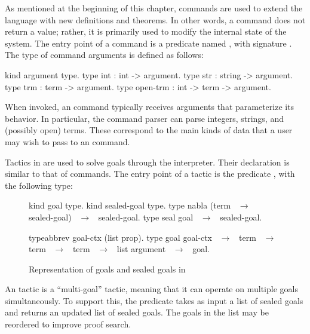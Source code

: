 As mentioned at the beginning of this chapter, commands are used to extend the
\rocq language with new definitions and theorems. In other words, a command
does not return a value; rather, it is primarily used to modify the internal
state of the system. The entry point of a command is a predicate named
, with signature .
The type of command arguments is defined as follows:

\begin{elpicode}
kind argument type.
type int      : int    -> argument.
type str      : string -> argument.
type trm      : term   -> argument.
type open-trm : int -> term -> argument.
\end{elpicode}

When invoked, an \elpi command typically receives arguments that
parameterize its behavior. In particular, the \elpi command parser can parse
integers, strings, and (possibly open) terms. These correspond to the main
kinds of data that a user may wish to pass to an \elpi command.

Tactics in \elpi are used to solve \rocq goals through the \elpi interpreter.
Their declaration is similar to that of commands. The entry point of a tactic is
the predicate , with the following type:
%
\begin{center}
\end{center}

\begin{figure}
\begin{elpicode}
kind goal type.
kind sealed-goal type.
type nabla (term ~$\to$~ sealed-goal) ~$\to$~ sealed-goal.
type seal  goal ~$\to$~ sealed-goal.

typeabbrev goal-ctx (list prop).
type goal  goal-ctx ~$\to$~ term ~$\to$~ term ~$\to$~ term ~$\to$~ list argument ~$\to$~ goal.
\end{elpicode}
\vspace{-1.5em}
\caption{Representation of goals and sealed goals in \rocqelpi}
\label{fig:goals-type}
\end{figure}

An \elpi tactic is a ``multi-goal'' tactic, meaning that it can operate on
multiple goals simultaneously. To support this, the  predicate takes
as input a list of sealed \rocq goals and returns an updated list of sealed
goals. The goals in the list may be reordered to improve proof search.

